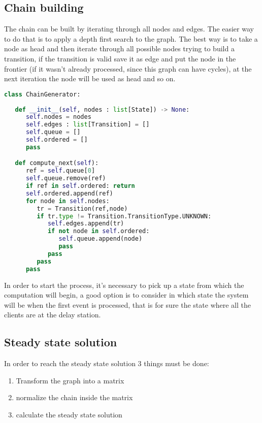 \documentclass[12pt,a4paper]{article}
\begin{document}
\subsection{Chain building}
The chain can be built by iterating through all nodes and edges. The easier way to do that is to apply a depth first search to the graph. The best way is to take a node as head and then iterate through all possible nodes trying to build a transition, if the transition is valid save it as edge and put the node in the frontier (if it wasn't already processed, since this graph can have cycles), at the next iteration the node will be used as head and so on. 
\begin{lstlisting}[language=python]
class ChainGenerator:
   
   def __init__(self, nodes : list[State]) -> None:
      self.nodes = nodes
      self.edges : list[Transition] = []
      self.queue = []
      self.ordered = []   
      pass

   def compute_next(self):
      ref = self.queue[0]
      self.queue.remove(ref)
      if ref in self.ordered: return
      self.ordered.append(ref)
      for node in self.nodes:
         tr = Transition(ref,node)
         if tr.type != Transition.TransitionType.UNKNOWN:
            self.edges.append(tr)
            if not node in self.ordered:
               self.queue.append(node)
               pass
            pass
         pass
      pass
\end{lstlisting}

In order to start the process, it's necessary to pick up a state from which the computation will begin, a good option is to consider in which state the system will be when the first event is processed, that is for sure the state where all the clients are at the delay station.

\subsection{Steady state solution}
In order to reach the steady state solution 3 things must be done:
\begin{enumerate}
    \item Transform the graph into a matrix 
    \item normalize the chain inside the matrix 
    \item calculate the steady state solution
\end{enumerate}
\end{document}
